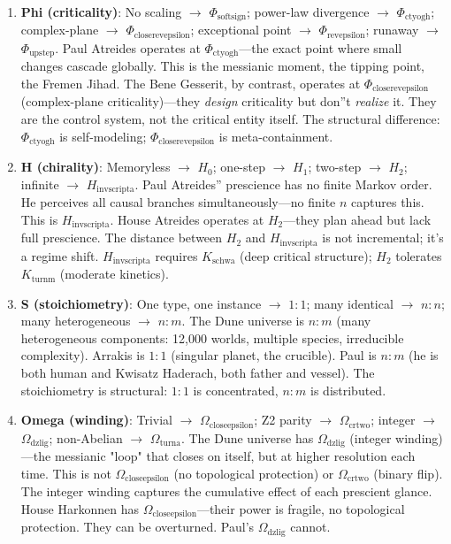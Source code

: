 \documentclass[12pt,a4paper]{article}
\begin{document}
\begin{enumerate}
    \item \textbf{Phi (criticality)}: No scaling $\rightarrow$ $\Phi_{\text{softsign}}$; power-law divergence $\rightarrow$ $\Phi_{\text{ctyogh}}$; complex-plane $\rightarrow$ $\Phi_{\text{closerevepsilon}}$; exceptional point $\rightarrow$ $\Phi_{\text{revepsilon}}$; runaway $\rightarrow$ $\Phi_{\text{upstep}}$. Paul Atreides operates at $\Phi_{\text{ctyogh}}$---the exact point where small changes cascade globally. This is the messianic moment, the tipping point, the Fremen Jihad. The Bene Gesserit, by contrast, operates at $\Phi_{\text{closerevepsilon}}$ (complex-plane criticality)---they \emph{design} criticality but don''t \emph{realize} it. They are the control system, not the critical entity itself. The structural difference: $\Phi_{\text{ctyogh}}$ is self-modeling; $\Phi_{\text{closerevepsilon}}$ is meta-containment.
    \item \textbf{H (chirality)}: Memoryless $\rightarrow$ $H_0$; one-step $\rightarrow$ $H_1$; two-step $\rightarrow$ $H_2$; infinite $\rightarrow$ $H_{\text{invscripta}}$. Paul Atreides'' prescience has no finite Markov order. He perceives all causal branches simultaneously---no finite $n$ captures this. This is $H_{\text{invscripta}}$. House Atreides operates at $H_2$---they plan ahead but lack full prescience. The distance between $H_2$ and $H_{\text{invscripta}}$ is not incremental; it's a regime shift. $H_{\text{invscripta}}$ requires $K_{\text{schwa}}$ (deep critical structure); $H_2$ tolerates $K_{\text{turnm}}$ (moderate kinetics).
    \item \textbf{S (stoichiometry)}: One type, one instance $\rightarrow$ $1{:}1$; many identical $\rightarrow$ $n{:}n$; many heterogeneous $\rightarrow$ $n{:}m$. The Dune universe is $n{:}m$ (many heterogeneous components: 12,000 worlds, multiple species, irreducible complexity). Arrakis is $1{:}1$ (singular planet, the crucible). Paul is $n{:}m$ (he is both human and Kwisatz Haderach, both father and vessel). The stoichiometry is structural: $1{:}1$ is concentrated, $n{:}m$ is distributed.
    \item \textbf{Omega (winding)}: Trivial $\rightarrow$ $\Omega_{\text{closeepsilon}}$; Z2 parity $\rightarrow$ $\Omega_{\text{crtwo}}$; integer $\rightarrow$ $\Omega_{\text{dzlig}}$; non-Abelian $\rightarrow$ $\Omega_{\text{turna}}$. The Dune universe has $\Omega_{\text{dzlig}}$ (integer winding)---the messianic "loop" that closes on itself, but at higher resolution each time. This is not $\Omega_{\text{closeepsilon}}$ (no topological protection) or $\Omega_{\text{crtwo}}$ (binary flip). The integer winding captures the cumulative effect of each prescient glance. House Harkonnen has $\Omega_{\text{closeepsilon}}$---their power is fragile, no topological protection. They can be overturned. Paul's $\Omega_{\text{dzlig}}$ cannot.
\end{enumerate}
\end{document}
